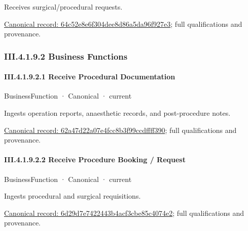 Receives surgical/procedural requests.


{\footnotesize \href{../../../../continuum/business/business-service/64c52e8e6f304dee8d86a5da96f927e3.md}{Canonical record: 64c52e8e6f304dee8d86a5da96f927e3}; full qualifications and provenance.}\par
\subsubsection*{III.4.1.9.2 Business Functions}
\label{navigation:III.4.1.9.2}

\paragraph*{III.4.1.9.2.1 Receive Procedural Documentation}
\label{navigation:III.4.1.9.2.1}

\label{element:62a47d22a07e4fcc8b3f99ccdffff390}
{\small BusinessFunction · Canonical · current}\par

Ingests operation reports, anaesthetic records, and post-procedure notes.


{\footnotesize \href{../../../../continuum/business/business-function/62a47d22a07e4fcc8b3f99ccdffff390.md}{Canonical record: 62a47d22a07e4fcc8b3f99ccdffff390}; full qualifications and provenance.}\par
\paragraph*{III.4.1.9.2.2 Receive Procedure Booking / Request}
\label{navigation:III.4.1.9.2.2}

\label{element:6d29d7e7422443b4acf3cbe85c4074e2}
{\small BusinessFunction · Canonical · current}\par

Ingests procedural and surgical requisitions.


{\footnotesize \href{../../../../continuum/business/business-function/6d29d7e7422443b4acf3cbe85c4074e2.md}{Canonical record: 6d29d7e7422443b4acf3cbe85c4074e2}; full qualifications and provenance.}\par
